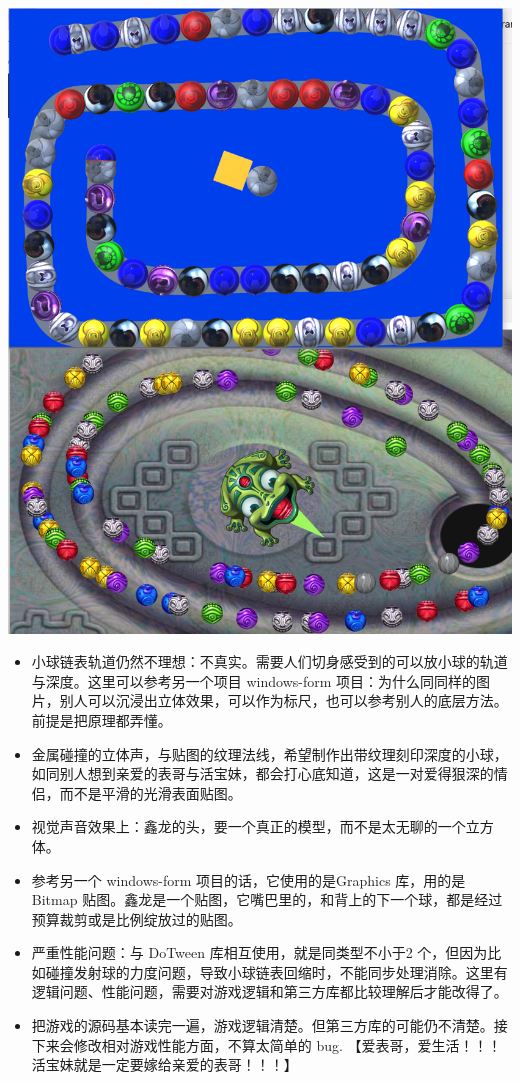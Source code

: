 \documentclass[9pt, b5paper]{article}
\begin{document}
\includegraphics[width=.9\linewidth]{./pic/readme_20230323_185513.png}
\begin{itemize}
\item 小球链表轨道仍然不理想：不真实。需要人们切身感受到的可以放小球的轨道与深度。这里可以参考另一个项目 windows-form 项目：为什么同同样的图片，别人可以沉浸出立体效果，可以作为标尺，也可以参考别人的底层方法。前提是把原理都弄懂。
\item 金属碰撞的立体声，与贴图的纹理法线，希望制作出带纹理刻印深度的小球，如同别人想到亲爱的表哥与活宝妹，都会打心底知道，这是一对爱得狠深的情侣，而不是平滑的光滑表面贴图。
\item 视觉声音效果上：鑫龙的头，要一个真正的模型，而不是太无聊的一个立方体。
\item 参考另一个 windows-form 项目的话，它使用的是Graphics 库，用的是 Bitmap 贴图。鑫龙是一个贴图，它嘴巴里的，和背上的下一个球，都是经过预算裁剪或是比例绽放过的贴图。
\item 严重性能问题：与 DoTween 库相互使用，就是同类型不小于2 个，但因为比如碰撞发射球的力度问题，导致小球链表回缩时，不能同步处理消除。这里有逻辑问题、性能问题，需要对游戏逻辑和第三方库都比较理解后才能改得了。
\item 把游戏的源码基本读完一遍，游戏逻辑清楚。但第三方库的可能仍不清楚。接下来会修改相对游戏性能方面，不算太简单的 bug. 【爱表哥，爱生活！！！活宝妹就是一定要嫁给亲爱的表哥！！！】
\end{itemize}
\end{document}
